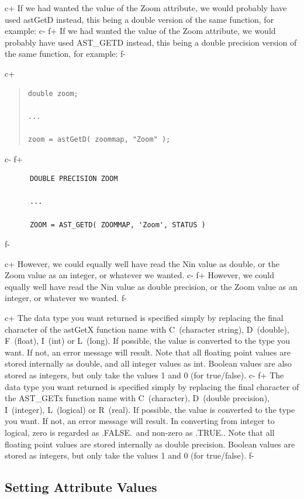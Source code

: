 \documentclass[twoside,11pt]{article}
\begin{document}
c+
If we had wanted the value of the Zoom attribute, we would probably
have used astGetD instead, this being a double version of the same
function, for example:
c-
f+
If we had wanted the value of the Zoom attribute, we would probably
have used AST\_GETD instead, this being a double precision version of
the same function, for example:
f-

c+
\begin{quote}
\small
\begin{verbatim}
double zoom;

...

zoom = astGetD( zoommap, "Zoom" );
\end{verbatim}
\normalsize
\end{quote}
c-
f+
\small
\begin{verbatim}
      DOUBLE PRECISION ZOOM

      ...

      ZOOM = AST_GETD( ZOOMMAP, 'Zoom', STATUS )
\end{verbatim}
\normalsize
f-

c+
However, we could equally well have read the Nin value as double, or
the Zoom value as an integer, or whatever we wanted.
c-
f+
However, we could equally well have read the Nin value as double
precision, or the Zoom value as an integer, or whatever we wanted.
f-

c+
The data type you want returned is specified simply by replacing the
final character of the astGetX function name with C~(character
string), D~(double), F~(float), I~(int) or L~(long). If possible, the
value is converted to the type you want. If not, an error message will
result. Note that all floating point values are stored internally as
double, and all integer values as int. Boolean values are also stored
as integers, but only take the values 1 and 0 (for true/false).
c-
f+
The data type you want returned is specified simply by replacing the
final character of the AST\_GETx function name with C~(character),
D~(double precision), I~(integer), L~(logical) or R~(real). If
possible, the value is converted to the type you want. If not, an
error message will result. In converting from integer to logical, zero
is regarded as .FALSE.\ and non-zero as .TRUE.. Note that all floating
point values are stored internally as double precision. Boolean values
are stored as integers, but only take the values 1 and 0 (for
true/false).
f-

\subsection{\label{ss:settingattributes}Setting Attribute Values}
\end{document}
